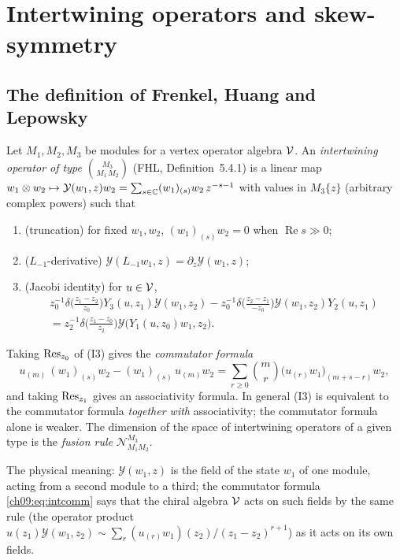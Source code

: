 \section{Intertwining operators and skew-symmetry}\label{ch09:sec:intertwiners}

\subsection{The definition of Frenkel, Huang and Lepowsky}

Let $M_1,M_2,M_3$ be modules for a vertex operator algebra $\mathcal{V}$. An \emph{intertwining
operator of type $\binom{M_3}{M_1\,M_2}$} (FHL, Definition~5.4.1) is a linear map
$w_1\otimes w_2\mapsto\mathcal Y(w_1,z)w_2=\sum_{s\in{\mathbb{C}}}(w_1)_{(s)}w_2\,z^{-s-1}$ with values in
$M_3\{z\}$ (arbitrary complex powers) such that
\begin{enumerate}
\item[(I1)] (truncation) for fixed $w_1,w_2$, $(w_1)_{(s)}w_2=0$ when $\operatorname{Re}s\gg0$;
\item[(I2)] ($L_{-1}$-derivative) $\mathcal Y(L_{-1}w_1,z)=\partial_z\mathcal Y(w_1,z)$;
\item[(I3)] (Jacobi identity) for $u\in\mathcal{V}$,
\begin{multline*}
z_0^{-1}\delta\!\Big(\frac{z_1-z_2}{z_0}\Big)Y_3(u,z_1)\mathcal Y(w_1,z_2)
-z_0^{-1}\delta\!\Big(\frac{z_2-z_1}{-z_0}\Big)\mathcal Y(w_1,z_2)Y_2(u,z_1)\\
=z_2^{-1}\delta\!\Big(\frac{z_1-z_0}{z_2}\Big)\mathcal Y\big(Y_1(u,z_0)w_1,z_2\big).
\end{multline*}
\end{enumerate}
Taking $\operatorname{Res}_{z_0}$ of (I3) gives the \emph{commutator formula}
\begin{equation}\label{ch09:eq:intcomm}
u_{(m)}\,(w_1)_{(s)}w_2-(w_1)_{(s)}\,u_{(m)}w_2=\sum_{r\ge0}\binom{m}{r}\big(u_{(r)}w_1\big)_{(m+s-r)}w_2 ,
\end{equation}
and taking $\operatorname{Res}_{z_1}$ gives an associativity formula. In general (I3) is equivalent to the
commutator formula \emph{together with} associativity; the commutator formula alone is weaker.
The dimension of the space of intertwining operators of a given type is the \emph{fusion rule}
$\mathcal N^{M_3}_{M_1M_2}$.

The physical meaning: $\mathcal Y(w_1,z)$ is the field of the state $w_1$ of one module, acting
from a second module to a third; the commutator formula \eqref{ch09:eq:intcomm} says that the
chiral algebra $\mathcal{V}$ acts on such fields by the same rule (the operator product
$u(z_1)\mathcal Y(w_1,z_2)\sim\sum_r (u_{(r)}w_1)(z_2)/(z_1-z_2)^{r+1}$) as it acts on its own
fields.

